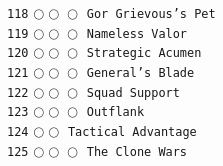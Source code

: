\documentclass[a4paper,landscape]{article}
\begin{document}
\begin{multicols*}{5}
\texttt{118} \(\bigcirc\!\bigcirc\!\bigcirc\)  \texttt{Gor Grievous's Pet} \vspace{-0.3mm}\\ 
\texttt{119} \(\bigcirc\!\bigcirc\!\bigcirc\)  \texttt{Nameless Valor} \vspace{-0.3mm}\\ 
\texttt{120} \(\bigcirc\!\bigcirc\!\bigcirc\)  \texttt{Strategic Acumen} \vspace{-0.3mm}\\ 
\texttt{121} \(\bigcirc\!\bigcirc\!\bigcirc\)  \texttt{General's Blade} \vspace{-0.3mm}\\ 
\texttt{122} \(\bigcirc\!\bigcirc\!\bigcirc\)  \texttt{Squad Support} \vspace{-0.3mm}\\ 
\texttt{123} \(\bigcirc\!\bigcirc\!\bigcirc\)  \texttt{Outflank} \vspace{-0.3mm}\\ 
\texttt{124} \(\bigcirc\!\bigcirc\)  \texttt{Tactical Advantage} \vspace{-0.3mm}\\ 
\texttt{125} \(\bigcirc\!\bigcirc\!\bigcirc\)  \texttt{The Clone Wars} \vspace{-0.3mm}\\ 

\end{multicols*}
\end{document}
